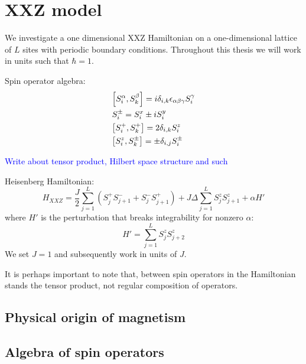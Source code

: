 \chapter{XXZ model\label{sec:xxz}}
\thispagestyle{chapterBeginStyle}

We investigate a one dimensional XXZ Hamiltonian on a one-dimensional lattice of \(L\) sites with periodic boundary conditions.
Throughout this thesis we will work in units such that \(\hbar = 1\).

Spin operator algebra:
\begin{align*}
    &\comm{S_{i}^{\alpha}}{S_{k}^{\beta}} = i  \delta_{i,k}\epsilon_{\alpha \beta \gamma} S_{i}^{\gamma}\\
    &S_{i}^{\pm} = \Sx_i \pm i \Sy_i\\
    &\comm{\Sp_i}{\Sp_k} = 2 \delta_{i,k} \Sz_i \\
    &\comm{\Sz_i}{S^{\pm}_k} = \pm \delta_{i,j} S_{i}^{\pm}
\end{align*}

\textcolor{blue}{Write about tensor product, Hilbert space structure and such}

\noindent Heisenberg Hamiltonian:
\begin{equation}
    H_{XXZ} = \frac{J}{2}\sum_{j = 1}^{L}\left( S^{+}_{j} S^{-}_{j+1} + S^{-}_{j}S^{+}_{j+1} \right) + J\Delta\sum_{j = 1}^{L} S^{z}_{j}S^{z}_{j+1}
    + \alpha H'
    \label{eq:HXXZ}
\end{equation}
where \(H'\) is the perturbation that breaks integrability for nonzero \(\alpha \):
\begin{equation}
    H'=\sum_{j = 1}^{L} S^{z}_{j}S^{z}_{j+2}
\end{equation}
We set \(J = 1\) and subsequently work in units of \(J\).

It is perhaps important to note that, between spin operators in the Hamiltonian stands
the tensor product, not regular composition of operators.

\section{Physical origin of magnetism}
\section{Algebra of spin operators}